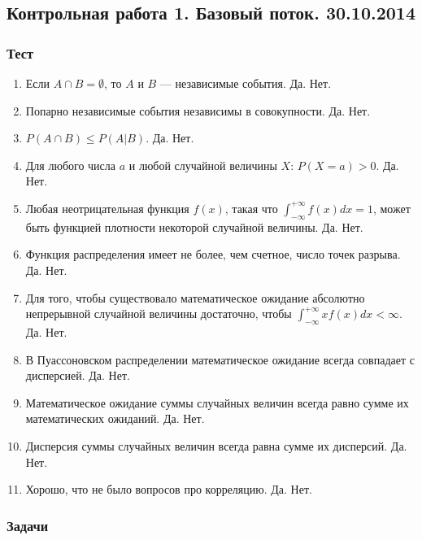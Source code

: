 \documentclass[12pt, a4paper]{article}\usepackage[]{graphicx}\usepackage[]{color}
\begin{document}
\subsection{Контрольная работа 1. Базовый поток. 30.10.2014}
\subsubsection*{Тест}

\begin{enumerate}

\item Если $A \cap B = \emptyset$, то $A$ и $B$ — независимые события. Да. Нет.

\item Попарно независимые события независимы в совокупности. Да. Нет.

\item $P(A \cap B) \le P(A|B)$. Да. Нет.

\item Для любого числа $a$ и любой случайной величины $X$: $P(X=a)>0$. Да. Нет.

\item Любая неотрицательная функция $f(x)$, такая что $\int_{-\infty}^{+\infty} f(x) dx = 1$, может быть функцией плотности некоторой случайной величины. Да. Нет.

\item Функция распределения имеет не более, чем счетное, число точек разрыва. Да. Нет.

\item Для того, чтобы существовало математическое ожидание абсолютно непрерывной случайной величины достаточно, чтобы $\int_{-\infty}^{+\infty} x f(x) dx < \infty$. Да. Нет.

\item В Пуассоновском распределении математическое ожидание всегда совпадает с дисперсией.	Да. Нет.

\item Математическое ожидание суммы случайных величин всегда равно сумме их математических ожиданий.	Да. Нет.

\item Дисперсия суммы случайных величин всегда равна сумме их дисперсий.	Да. Нет.

\item Хорошо, что не было вопросов про корреляцию.	Да. Нет.

\end{enumerate}

\subsubsection*{Задачи}
\end{document}
